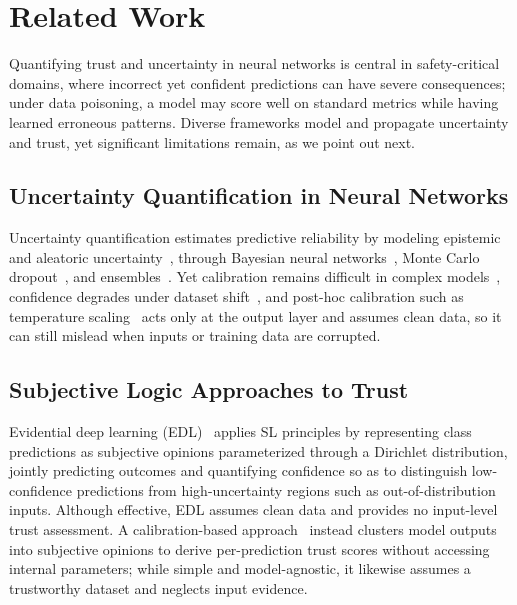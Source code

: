 \vspace{-0.5em}
\section{Related Work}\label{sec:rw}

Quantifying trust and uncertainty in neural networks is central in safety-critical domains, where incorrect yet confident predictions can have severe consequences; under data poisoning, a model may score well on standard metrics while having learned erroneous patterns. Diverse frameworks model and propagate uncertainty and trust, yet significant limitations remain, as we point out next.
\vspace{-0.5em}
\subsection{Uncertainty Quantification in Neural Networks}

Uncertainty quantification estimates predictive reliability by modeling epistemic and aleatoric uncertainty~\cite{kendall2017uncertainties}, through Bayesian neural networks~\cite{neal1996bayesian,blundell2015weightuncertaintyneuralnetworks,pmlr-v80-depeweg18a}, Monte Carlo dropout~\cite{gal2016dropoutbayesianapproximationrepresenting}, and ensembles~\cite{lakshminarayanan2017simplescalablepredictiveuncertainty}. Yet calibration remains difficult in complex models~\cite{Gawlikowski2023}, confidence degrades under dataset shift~\cite{begoli2019need,2506.07461,1906.02530}, and post-hoc calibration such as temperature scaling~\cite{guo2017calibrationmodernneuralnetworks} acts only at the output layer and assumes clean data, so it can still mislead when inputs or training data are corrupted.
\vspace{-0.5em}
\subsection{Subjective Logic Approaches to Trust}

Evidential deep learning (EDL)~\cite{sensoy2018evidentialdeeplearningquantify} applies SL principles by representing class predictions as subjective opinions parameterized through a Dirichlet distribution, jointly predicting outcomes and quantifying confidence so as to distinguish low-confidence predictions from high-uncertainty regions such as out-of-distribution inputs. Although effective, EDL assumes clean data and provides no input-level trust assessment. A calibration-based approach~\cite{11124121} instead clusters model outputs into subjective opinions to derive per-prediction trust scores without accessing internal parameters; while simple and model-agnostic, it likewise assumes a trustworthy dataset and neglects input evidence.

